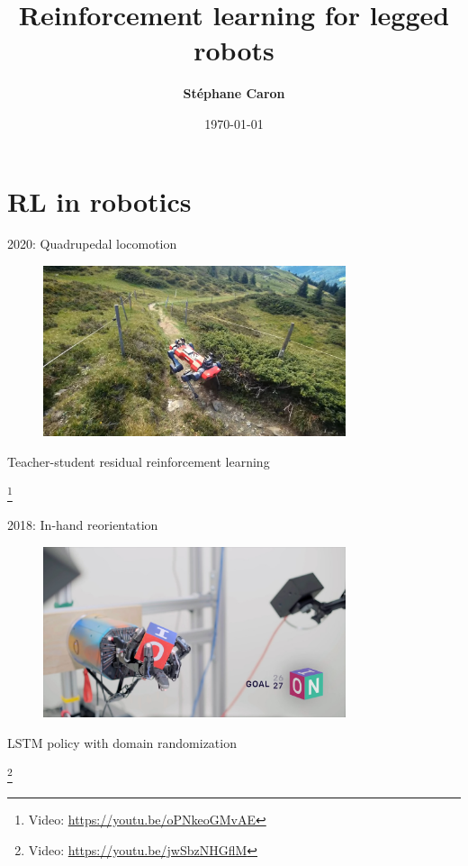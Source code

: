 \documentclass[10pt, aspectratio=1610]{beamer}
\title{
    Reinforcement learning for legged robots
}
\author{\textbf{St\'ephane Caron}}
\date{\today}
\institute{Inria, \'{E}cole normale sup\'{e}rieure}
\newcommand\blfootnote[1]{%
  \begingroup
  \renewcommand\thefootnote{}%
  \footnote{#1}%
  \addtocounter{footnote}{-1}%
  \endgroup
}
\begin{document}
\maketitle


\section*{RL in robotics}

\begin{frame}{2020: Quadrupedal locomotion}
    \vspace{1.5em}
    \begin{figure}
        \includegraphics[height=5cm]{figures/hike-with-anymal.jpg}
    \end{figure}
    \begin{center}
        Teacher-student residual reinforcement learning~\cite{lee2020}
    \end{center}
    \blfootnote{Video: \url{https://youtu.be/oPNkeoGMvAE}}
\end{frame}

\begin{frame}{2018: In-hand reorientation}
    \vspace{1.5em}
    \begin{figure}
        \includegraphics[height=5cm]{figures/in-hand-reorientation.jpg}
    \end{figure}
    \begin{center}
        LSTM policy with domain randomization~\cite{andrychowicz2020learning}
    \end{center}
    \blfootnote{Video: \url{https://youtu.be/jwSbzNHGflM}}
\end{frame}
\end{document}

